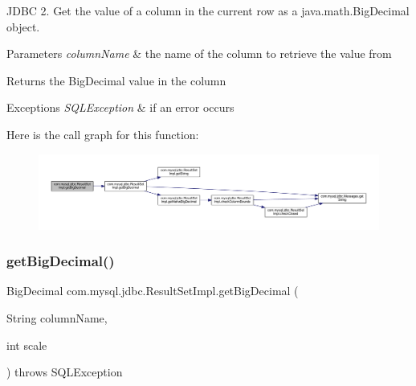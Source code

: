 J\+D\+BC 2. Get the value of a column in the current row as a java.\+math.\+Big\+Decimal object.


\begin{DoxyParams}{Parameters}
{\em column\+Name} & the name of the column to retrieve the value from\\
\hline
\end{DoxyParams}
\begin{DoxyReturn}{Returns}
the Big\+Decimal value in the column
\end{DoxyReturn}

\begin{DoxyExceptions}{Exceptions}
{\em S\+Q\+L\+Exception} & if an error occurs \\
\hline
\end{DoxyExceptions}
Here is the call graph for this function\+:
\nopagebreak
\begin{figure}[H]
\begin{center}
\leavevmode
\includegraphics[width=350pt]{classcom_1_1mysql_1_1jdbc_1_1_result_set_impl_a0961f23e3e7323a9ca5b31d029cb2b73_cgraph}
\end{center}
\end{figure}
\mbox{\label{classcom_1_1mysql_1_1jdbc_1_1_result_set_impl_af0f4488c8af3d0ce0ca5c9e38c265365}} 
\subsubsection{\texorpdfstring{get\+Big\+Decimal()}{getBigDecimal()}\hspace{0.1cm}{\footnotesize\ttfamily [4/4]}}
{\footnotesize\ttfamily Big\+Decimal com.\+mysql.\+jdbc.\+Result\+Set\+Impl.\+get\+Big\+Decimal (\begin{DoxyParamCaption}\item[{String}]{column\+Name,  }\item[{int}]{scale }\end{DoxyParamCaption}) throws S\+Q\+L\+Exception}


